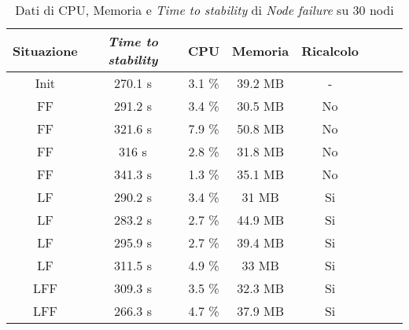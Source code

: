     \begin{table}[H]
    \caption{Dati di CPU, Memoria e \textit{Time to stability} di \textit{Node failure} su 30 nodi}
    \label{tab:NF30}
    \begin{center}
        \begin{tabular}{|c|c|c|c|c|c|c|c|}
            \hline
            Situazione & \textit{Time to stability} & CPU & Memoria & Ricalcolo\\
            \hline
            Init & 270.1 s & 3.1 \% & 39.2 MB & -\\
            FF    & 291.2 s  & 3.4 \%  & 30.5 MB & No\\
            FF    & 321.6 s  & 7.9 \%  & 50.8 MB & No\\
            FF    & 316 s  & 2.8 \%  & 31.8 MB & No\\
            FF    & 341.3 s  & 1.3 \%  & 35.1 MB & No\\
            LF    & 290.2 s  & 3.4 \%  & 31   MB & Si\\
            LF    & 283.2 s  & 2.7 \%  & 44.9 MB & Si\\
            LF    & 295.9 s  & 2.7 \%  & 39.4 MB & Si\\
            LF    & 311.5 s  & 4.9 \%  & 33   MB & Si\\
            LFF    & 309.3 s  & 3.5 \%  & 32.3 MB & Si\\
            LFF   & 266.3 s  & 4.7 \%  & 37.9 MB & Si\\
            \hline
        \end{tabular}
        \end{center}
    \end{table}
    
